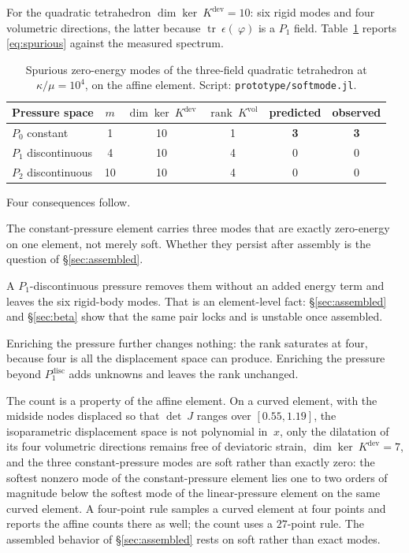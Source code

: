 \documentclass[11pt]{article}
\newcommand{\eps}{~\epsilon}
\newcommand{\disp}{~\varphi}
\newcommand{\bx}{~x}
\newcommand{\trace}{\operatorname{tr}}
\newcommand{\supvol}{^{\mathrm{vol}}}
\newcommand{\supdev}{^{\mathrm{dev}}}
\newcommand{\code}[1]{\texttt{#1}}
\theoremstyle{definition}
\theoremstyle{plain}
\begin{document}
For the quadratic tetrahedron $\dim\ker ~K\supdev = 10$: six rigid modes and
four volumetric directions, the latter because $\trace\eps(\disp)$ is a $P_1$
field. Table~\ref{tab:count} reports \eqref{eq:spurious} against the measured
spectrum.

\begin{table}[h]
\centering
\begin{tabular}{@{}lccccc@{}}
\toprule
Pressure space & $m$ & $\dim\ker ~K\supdev$ & $\operatorname{rank} ~K\supvol$ & predicted & observed \\
\midrule
$P_0$ constant            & 1  & 10 & 1 & \textbf{3} & \textbf{3} \\
$P_1$ discontinuous       & 4  & 10 & 4 & 0 & 0 \\
$P_2$ discontinuous       & 10 & 10 & 4 & 0 & 0 \\
\bottomrule
\end{tabular}
\caption{Spurious zero-energy modes of the three-field quadratic tetrahedron at
$\kappa/\mu = 10^4$, on the affine element. Script:
\code{prototype/softmode.jl}.}
\label{tab:count}
\end{table}

Four consequences follow.

The constant-pressure element carries three modes that are exactly
zero-energy on one element, not merely soft. Whether they persist after assembly is
the question of \S\ref{sec:assembled}.

A $P_1$-discontinuous pressure removes them without an added energy term and
leaves the six rigid-body modes. That is an element-level fact:
\S\ref{sec:assembled} and \S\ref{sec:beta} show that the same pair locks and
is unstable once assembled.

Enriching the pressure further changes nothing: the rank saturates at four,
because four is all the displacement space can produce. Enriching the
pressure beyond $P_1^{\mathrm{disc}}$ adds unknowns and leaves the rank
unchanged.

The count is a property of the affine element. On a curved element, with the
midside nodes displaced so that $\det ~J$ ranges over $[0.55, 1.19]$, the
isoparametric displacement space is not polynomial in $\bx$, only the
dilatation of its four volumetric directions remains free of deviatoric
strain, $\dim\ker ~K\supdev = 7$, and the three constant-pressure modes are
soft rather than exactly zero: the softest nonzero mode of the
constant-pressure element lies one to two orders of magnitude below the
softest mode of the linear-pressure element on the same curved element. A
four-point rule samples a curved element at four points and reports the
affine counts there as well; the count uses a $27$-point rule. The assembled
behavior of \S\ref{sec:assembled} rests on soft rather than exact modes.
\end{document}
